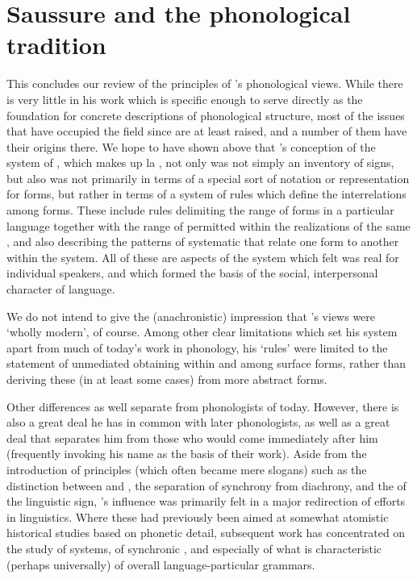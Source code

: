 \section{Saussure and the phonological tradition}

This concludes our review of the principles of {\Saussure}'s phonological
views. While there is very little in his work which is specific enough
to serve directly as the foundation for concrete descriptions of
phonological structure, most of the issues that have occupied the
field since are at least raised, and a number of them have their
origins there. We hope to have shown above that {\Saussure}'s conception
of the system of \emph{}, which makes up la \emph{},
not only was not simply an inventory of signs, but also was not
primarily in terms of a special sort of notation or representation for
forms, but rather in terms of a system of rules which define the
interrelations among forms. These include rules delimiting the range
of forms in a particular language together with the range of 
permitted within the realizations of the same \emph{}, and
also describing the patterns of systematic  that relate one
form to another within the system. All of these are aspects of the
system which {\Saussure} felt was real for individual speakers, and which
formed the basis of the social, interpersonal character of language.

We do not intend to give the (anachronistic) impression that
{\Saussure}'s views were `wholly modern', of course. Among other clear
limitations which set his system apart from much of today's work in
phonology, his `rules' were limited to the statement of unmediated
 obtaining within and among surface forms, rather than
deriving these (in at least some cases) from more abstract forms.

Other differences as well separate {\Saussure} from phonologists of
today. However, there is also a great deal he has in common with later
phonologists, as well as a great deal that separates him from those
who would come immediately after him (frequently invoking his name as
the basis of their work). Aside from the introduction of principles
(which often became mere slogans) such as the distinction between
\emph{} and \emph{}, the separation of synchrony from
diachrony, and the  of the linguistic sign, {\Saussure}'s
influence was primarily felt in a major redirection of efforts in
linguistics. Where these had previously been aimed at somewhat
atomistic historical studies based on phonetic detail, subsequent work
has concentrated on the study of systems, of synchronic ,
and especially of what is characteristic (perhaps universally) of
overall language-particular grammars.

